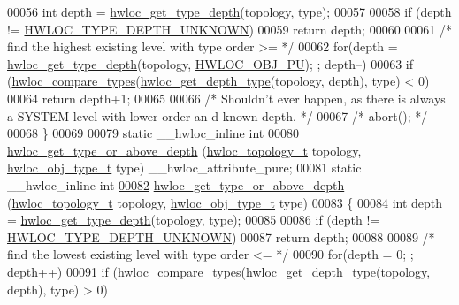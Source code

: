 \begin{DoxyCode}
00056   \textcolor{keywordtype}{int} depth = \hyperlink{a00046_gaea7c64dd59467f5201ba87712710b14d}{hwloc_get_type_depth}(topology, type);
00057 
00058   \textcolor{keywordflow}{if} (depth != \hyperlink{a00046_ggaf4e663cf42bbe20756b849c6293ef575a0565ab92ab72cb0cec91e23003294aad}{HWLOC_TYPE_DEPTH_UNKNOWN})
00059     \textcolor{keywordflow}{return} depth;
00060 
00061   \textcolor{comment}{/* find the highest existing level with type order >= */}
00062   \textcolor{keywordflow}{for}(depth = \hyperlink{a00046_gaea7c64dd59467f5201ba87712710b14d}{hwloc_get_type_depth}(topology, \hyperlink{a00041_ggacd37bb612667dc437d66bfb175a8dc55abca6887e80cb291353b0a0c1da83f661}{HWLOC_OBJ_PU}); ; depth--)
00063     \textcolor{keywordflow}{if} (\hyperlink{a00041_gabd7da4f4ea12b420b8ecbde458b27805}{hwloc_compare_types}(\hyperlink{a00046_gadd4964764ae7e49231065d58a553fd31}{hwloc_get_depth_type}(topology, depth), type) < 0)
00064       \textcolor{keywordflow}{return} depth+1;
00065 
00066   \textcolor{comment}{/* Shouldn't ever happen, as there is always a SYSTEM level with lower order an
      d known depth.  */}
00067   \textcolor{comment}{/* abort(); */}
00068 \}
00069 
00079 \textcolor{keyword}{static} \_\_hwloc\_inline \textcolor{keywordtype}{int}
00080 \hyperlink{a00052_ga62a3f401854c209605c90079700f4bc5}{hwloc_get_type_or_above_depth} (\hyperlink{a00039_ga9d1e76ee15a7dee158b786c30b6a6e38}{hwloc_topology_t} topology, \hyperlink{a00041_gacd37bb612667dc437d66bfb175a8dc55}{hwloc_obj_type_t} type) 
      \_\_hwloc\_attribute\_pure;
00081 \textcolor{keyword}{static} \_\_hwloc\_inline \textcolor{keywordtype}{int}
\hypertarget{a00031_source_l00082}{}\hyperlink{a00052_ga62a3f401854c209605c90079700f4bc5}{00082} \hyperlink{a00052_ga62a3f401854c209605c90079700f4bc5}{hwloc_get_type_or_above_depth} (\hyperlink{a00039_ga9d1e76ee15a7dee158b786c30b6a6e38}{hwloc_topology_t} topology, \hyperlink{a00041_gacd37bb612667dc437d66bfb175a8dc55}{hwloc_obj_type_t} type)
00083 \{
00084   \textcolor{keywordtype}{int} depth = \hyperlink{a00046_gaea7c64dd59467f5201ba87712710b14d}{hwloc_get_type_depth}(topology, type);
00085 
00086   \textcolor{keywordflow}{if} (depth != \hyperlink{a00046_ggaf4e663cf42bbe20756b849c6293ef575a0565ab92ab72cb0cec91e23003294aad}{HWLOC_TYPE_DEPTH_UNKNOWN})
00087     \textcolor{keywordflow}{return} depth;
00088 
00089   \textcolor{comment}{/* find the lowest existing level with type order <= */}
00090   \textcolor{keywordflow}{for}(depth = 0; ; depth++)
00091     \textcolor{keywordflow}{if} (\hyperlink{a00041_gabd7da4f4ea12b420b8ecbde458b27805}{hwloc_compare_types}(\hyperlink{a00046_gadd4964764ae7e49231065d58a553fd31}{hwloc_get_depth_type}(topology, depth), type) > 0)

\end{DoxyCode}
